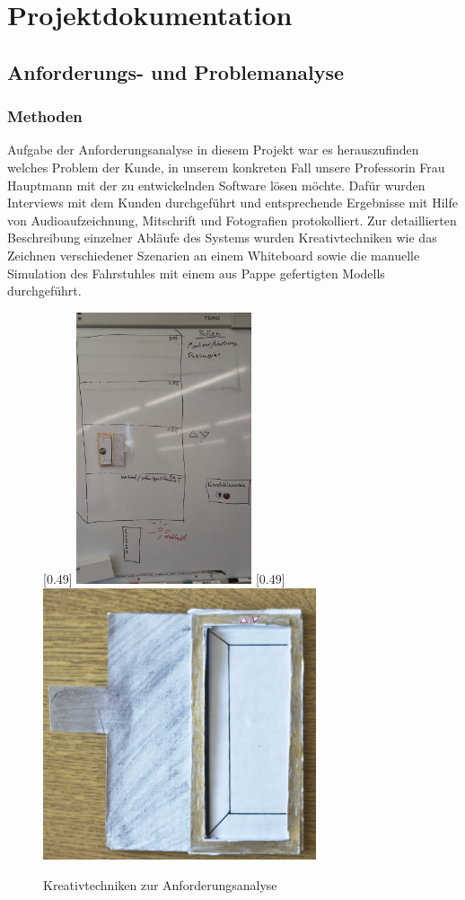 \part{Projektdokumentation}
\chapter{Anforderungs- und Problemanalyse}
\section{Methoden}
Aufgabe der Anforderungsanalyse in diesem Projekt war es herauszufinden
welches Problem der Kunde, in unserem konkreten Fall unsere Professorin Frau
Hauptmann mit der zu entwickelnden Software lösen möchte. Dafür wurden
Interviews mit dem Kunden durchgeführt und entsprechende Ergebnisse mit Hilfe
von Audioaufzeichnung, Mitschrift und Fotografien protokolliert. Zur
detaillierten Beschreibung einzelner Abläufe des Systems wurden
Kreativtechniken wie das Zeichnen verschiedener Szenarien an einem Whiteboard
sowie die manuelle Simulation des Fahrstuhles mit einem aus Pappe gefertigten Modells durchgeführt.
\begin{figure}[hbt]
\centering
{}[0.49\linewidth]
{\includegraphics[height=8cm]{images/kundengespraech1.jpg}}
[0.49\linewidth]
{\includegraphics[height=8cm]{images/pappfahrstuhl.jpg}}
\caption{Kreativtechniken zur Anforderungsanalyse}
\end{figure}
